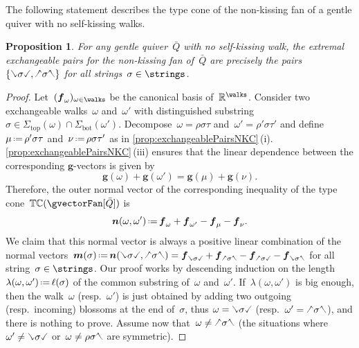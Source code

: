 \documentclass{amsart}
\newtheorem{proposition}[theorem]{Proposition}
\theoremstyle{definition}
\newcommand{\R}{\mathbb{R}} %
\renewcommand{\b}[1]{{\boldsymbol{#1}}} %
\newcommand{\eqdef}{\mbox{\,\raisebox{0.2ex}{\scriptsize\ensuremath{\mathrm:}}\ensuremath{=}\,}} %
\newcommand{\gvector}[1]{\b{g}(#1)} %
\newcommand{\typeCone}{\mathbb{TC}} %
\newcommand{\quiver}{\bar Q} %
\renewcommand{\top}{\mathrm{top}} %
\newcommand{\bottom}{\mathrm{bot}} %
\newcommand{\hL}{\text{\rotatebox[origin=c]{180}{\checked}}}
\newcommand{\hR}{\text{\rotatebox[origin=c]{180}{\reflectbox{\checked}}}}
\newcommand{\cL}{\text{\reflectbox{\checked}}}
\newcommand{\cR}{\text{\checked}}
\newcommand{\hh}[1]{\hL#1\hR} %
\newcommand{\cc}[1]{\cL#1\cR} %
\newcommand{\hc}[1]{\hL#1\cR} %
\newcommand{\ch}[1]{\cL#1\hR} %
\begin{document}
The following statement describes the type cone of the non-kissing fan of a gentle quiver with no self-kissing walks.

\begin{proposition}
\label{prop:extremalExchangeablePairsNKC}
For any gentle quiver~$\quiver$ with no self-kissing walk, the extremal exchangeable pairs for the non-kissing fan of~$\quiver$ are precisely the pairs~$\{\cc{\sigma}, \hh{\sigma}\}$ for all strings~$\sigma \in \strings$.
\end{proposition}

\begin{proof}
Let~$(\b{f}_\omega)_{\omega \in \walks}$ be the canonical basis of~$\R^{\walks}$.
Consider two exchangeable walks~$\omega$ and~$\omega'$ with distinguished substring~$\sigma \in \Sigma_\top(\omega) \cap \Sigma_\bottom(\omega')$.
Decompose~$\omega = \rho \sigma \tau$ and~$\omega' = \rho' \sigma \tau'$ and define~$\mu \eqdef \rho' \sigma \tau$ and~$\nu \eqdef \rho \sigma \tau'$ as in \cref{prop:exchangeablePairsNKC}\,(i). \cref{prop:exchangeablePairsNKC}\,(iii) ensures that the linear dependence between the corresponding $\b{g}$-vectors is given by
\[
\gvector{\omega} + \gvector{\omega'} = \gvector{\mu} + \gvector{\nu}.
\]
Therefore, the outer normal vector of the corresponding inequality of the type cone~$\typeCone(\gvectorFan[\quiver])$ is
\[
\b{n}(\omega, \omega') \eqdef \b{f}_\omega + \b{f}_{\omega'} - \b{f}_\mu - \b{f}_\nu.
\]
We claim that this normal vector is always a positive linear combination of the normal vectors~$\b{m}(\sigma) \eqdef \b{n}(\cc{\sigma}, \hh{\sigma}) = \b{f}_{\cc{\sigma}} + \b{f}_{\hh{\sigma}} - \b{f}_{\hc{\sigma}} - \b{f}_{\ch{\sigma}}$ for all string~$\sigma \in \strings$.
Our proof works by descending induction on the length~$\lambda(\omega,\omega') \eqdef \ell(\sigma)$ of the common substring of~$\omega$ and~$\omega'$.
If~$\lambda(\omega, \omega')$ is big enough, then the walk~$\omega$ (resp.~$\omega'$) is just obtained by adding two outgoing (resp.~incoming) blossoms at the end of~$\sigma$, thus $\omega = \cc{\sigma}$ (resp.~$\omega' = \hh{\sigma}$), and there is nothing to prove.
Assume now that~$\omega \ne \hh{\sigma}$ (the situations where~$\omega' \ne \cc{\sigma}$ or~$\omega \ne \rho \sigma \hR$ are symmetric).

\end{proof}
\end{document}
